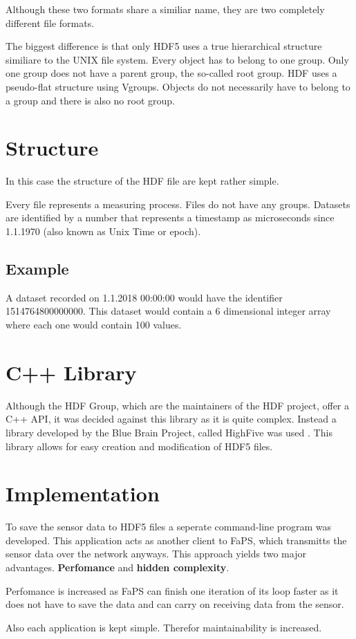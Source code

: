 Although these two formats share a similiar name, they are two completely different file formats.

The biggest difference is that only HDF5 uses a true hierarchical structure similiare to the UNIX file system. Every object has to belong to one group. Only one group does not have a parent group, the so-called root group.
HDF uses a pseudo-flat structure using Vgroups. Objects do not necessarily have to belong to a group and there is also no root group.

\section{Structure}

In this case the structure of the HDF file are kept rather simple.

Every file represents a measuring process. Files do not have any groups. Datasets are identified by a number that represents a timestamp as microseconds since 1.1.1970 (also known as Unix Time or epoch).

\subsection{Example}

A dataset recorded on 1.1.2018 00:00:00 would have the identifier 1514764800000000. This dataset would contain a 6 dimensional integer array where each one would contain 100 values.

\section {C++ Library}

Although the HDF Group, which are the maintainers of the HDF project, offer a C++ API, it was decided against this library as it is quite complex. Instead a library developed by the Blue Brain Project, called HighFive was
used \autocite{HighFive}. This library allows for easy creation and modification of HDF5 files.

\section{Implementation}

To save the sensor data to HDF5 files a seperate command-line program was developed. This application acts as another client to FaPS, which transmitts the sensor data over the network anyways. This approach yields two
major advantages. \textbf{Perfomance} and \textbf{hidden complexity}.

Perfomance is increased as FaPS can finish one iteration of its loop faster as it does not have to save the data and can carry on receiving data from the sensor.

Also each application is kept simple. Therefor maintainability is increased.
